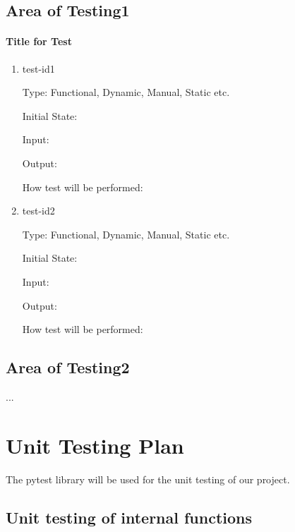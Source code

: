 \documentclass[12pt, titlepage]{article}
\begin{document}
\subsection{Area of Testing1}
		
\paragraph{Title for Test}

\begin{enumerate}

\item{test-id1\\}

Type: Functional, Dynamic, Manual, Static etc.
					
Initial State: 
					
Input: 
					
Output: 
					
How test will be performed: 
					
\item{test-id2\\}

Type: Functional, Dynamic, Manual, Static etc.
					
Initial State: 
					
Input: 
					
Output: 
					
How test will be performed: 

\end{enumerate}

\subsection{Area of Testing2}

...
	
\section{Unit Testing Plan}

The pytest library will be used for the unit testing of our project.
		
\subsection{Unit testing of internal functions}
\end{document}
